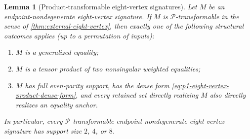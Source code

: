 \documentclass[11pt,letterpaper,onecolumn]{article}
\theoremstyle{plain}
\newtheorem{lemma}[lemma]{Lemma}
\theoremstyle{definition}
\theoremstyle{remark}
\newcommand{\cP}{\mathscr P}
\begin{document}
\begin{lemma}[Product-transformable eight-vertex signatures]
\label{lem:p1-eight-vertex-product-transform}\leavevmode\newline
Let \(M\) be an endpoint-nondegenerate eight-vertex signature.  If \(M\) is
\(\cP\)-transformable in the sense of
\cref{thm:external-eight-vertex}, then exactly one of the following
structural outcomes applies (up to a permutation of inputs):
\begin{enumerate}
\item \(M\) is a generalized equality;
\item \(M\) is a tensor product of two nonsingular weighted equalities;
\item \(M\) has full even-parity support, has the dense form
      \cref{eq:p1-eight-vertex-product-dense-form}, and every retained set
      directly realizing \(M\) also directly realizes an equality anchor.
\end{enumerate}
In particular, every
\(\cP\)-transformable endpoint-nondegenerate eight-vertex signature has support size \(2\), \(4\), or
\(8\).
\end{lemma}
\end{document}
